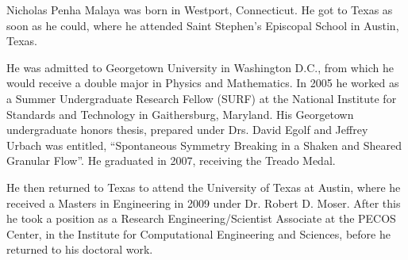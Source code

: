 
Nicholas Penha Malaya was born in Westport, Connecticut. He got to Texas
as soon as he could, where he attended Saint Stephen's Episcopal School in
Austin, Texas. 

He was admitted to Georgetown University in Washington D.C., from
which he would receive a double major in Physics and Mathematics. In
2005 he worked as a Summer Undergraduate Research Fellow (SURF) at the
National Institute for Standards and Technology in Gaithersburg,
Maryland. His Georgetown undergraduate honors thesis, prepared under
Drs\@. David Egolf and Jeffrey Urbach was entitled, ``Spontaneous
Symmetry Breaking in a Shaken and Sheared Granular Flow''. He graduated
in 2007, receiving the Treado Medal.   

He then returned to Texas to attend the University of Texas at
Austin, where he received a Masters in Engineering in 2009 under
Dr\@. Robert D. Moser. After this he took a position as a Research
Engineering/Scientist Associate at the PECOS Center, in the Institute
for Computational Engineering and Sciences, before he returned to his
doctoral work. 


